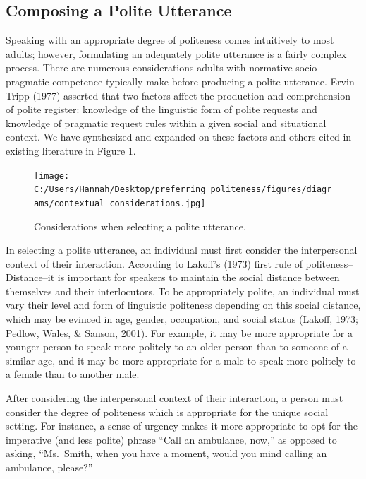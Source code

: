 \documentclass[
  english,
  man,floatsintext]{apa6}
\begin{document}
\hypertarget{composing-a-polite-utterance}{%
\subsection{Composing a Polite Utterance}\label{composing-a-polite-utterance}}

Speaking with an appropriate degree of politeness comes intuitively to most adults; however, formulating an adequately polite utterance is a fairly complex process. There are numerous considerations adults with normative socio-pragmatic competence typically make before producing a polite utterance. Ervin-Tripp (1977) asserted that two factors affect the production and comprehension of polite register: knowledge of the linguistic form of polite requests and knowledge of pragmatic request rules within a given social and situational context. We have synthesized and expanded on these factors and others cited in existing literature in Figure 1.

\begin{figure}
\centering
\texttt{[image: C:/Users/Hannah/Desktop/preferring\_politeness/figures/diagrams/contextual\_considerations.jpg]}
\caption{Considerations when selecting a polite utterance.}
\end{figure}

In selecting a polite utterance, an individual must first consider the interpersonal context of their interaction. According to Lakoff's (1973) first rule of politeness--Distance--it is important for speakers to maintain the social distance between themselves and their interlocutors. To be appropriately polite, an individual must vary their level and form of linguistic politeness depending on this social distance, which may be evinced in age, gender, occupation, and social status (Lakoff, 1973; Pedlow, Wales, \& Sanson, 2001). For example, it may be more appropriate for a younger person to speak more politely to an older person than to someone of a similar age, and it may be more appropriate for a male to speak more politely to a female than to another male.

After considering the interpersonal context of their interaction, a person must consider the degree of politeness which is appropriate for the unique social setting. For instance, a sense of urgency makes it more appropriate to opt for the imperative (and less polite) phrase ``Call an ambulance, now,'' as opposed to asking, ``Ms.~Smith, when you have a moment, would you mind calling an ambulance, please?''
\end{document}
